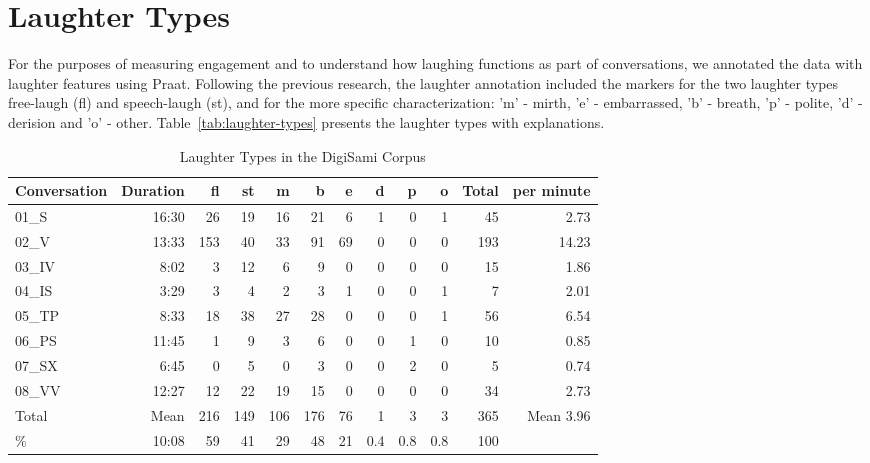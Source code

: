 \documentclass[10pt,journal,compsoc]{IEEEtran}
\begin{document}
\section{Laughter Types}
\label{sec:laughter-types}

For the purposes of measuring engagement and to understand how laughing functions as part of conversations, we annotated the data with laughter features using Praat. Following the previous research, the laughter annotation included the markers for the two laughter types free-laugh (fl) and speech-laugh (st), and for the more specific characterization: 'm' - mirth, 'e' - embarrassed, 'b' - breath, 'p' - polite, 'd' - derision and 'o' - other. Table~\ref{tab:laughter-types} presents the laughter types with explanations.

\begin{table}[!t]
\caption{Laughter Types in the DigiSami Corpus}
\label{tab:laughter-digisami}
\centering
\begin{tabular}{| l | r | r r | r r r r r r | r | r |}
\hline
Conversation & Duration & fl  & st & m & b & e & d & p & o & Total & per minute \\
\hline
01\_S & 16:30 & 26 & 19 & 16 & 21 & 6 & 1 & 0 & 1 & 45 & 2.73 \\
02\_V & 13:33 & 153 & 40 & 33 & 91 & 69 & 0 & 0 & 0 & 193 & 14.23 \\
03\_IV & 8:02 & 3 & 12 & 6 & 9 & 0 & 0 & 0 & 0 & 15 & 1.86 \\
04\_IS & 3:29 & 3 & 4 & 2 & 3 & 1 & 0 & 0 & 1 & 7 & 2.01 \\
05\_TP & 8:33 & 18 & 38 & 27 & 28 & 0 & 0 & 0 & 1 & 56 & 6.54 \\
06\_PS & 11:45 & 1 & 9 & 3 & 6 & 0 & 0 & 1 & 0 & 10 & 0.85 \\
07\_SX & 6:45 & 0 & 5 & 0 & 3 & 0 & 0 & 2 & 0 & 5 & 0.74 \\
08\_VV & 12:27 & 12 & 22 & 19 & 15 & 0 & 0 & 0 & 0 & 34 & 2.73 \\
\hline
Total  & Mean  & 216 & 149 & 106 & 176 & 76 & 1 & 3 & 3 & 365 & Mean 3.96 \\
\%     & 10:08 &  59 &  41 &  29 &  48 & 21 & 0.4 & 0.8 & 0.8 & 100 & \\
\hline
\end{tabular}
\end{table}
\end{document}
